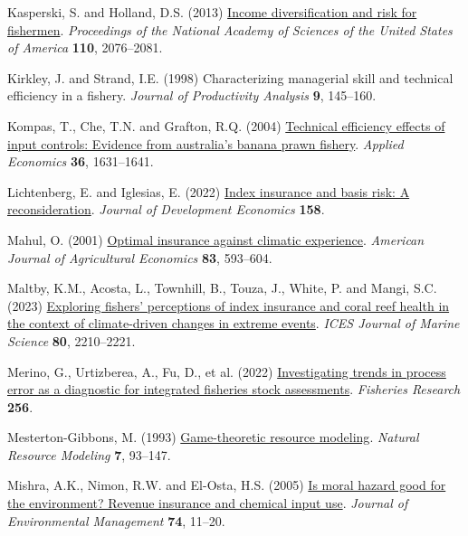 \documentclass[
  letterpaper,
  DIV=11,
  numbers=noendperiod]{scrartcl}
\newlength{\cslhangindent}
\newlength{\cslentryspacingunit} %
\newenvironment{CSLReferences}[2] %
 {%
  \setlength{\parindent}{0pt}
  \ifodd #1
  \let\oldpar\par
  \def\par{\hangindent=\cslhangindent\oldpar}
  \fi
  \setlength{\parskip}{#2\cslentryspacingunit}
 }%
 {}
\theoremstyle{plain}
\theoremstyle{plain}
\theoremstyle{remark}
\begin{document}
\begin{CSLReferences}{1}{0}
\leavevmode{}%
Kasperski, S. and Holland, D.S. (2013)
\href{https://doi.org/10.1073/pnas.1212278110}{Income diversification
and risk for fishermen}. \emph{Proceedings of the National Academy of
Sciences of the United States of America} \textbf{110}, 2076--2081.

\leavevmode{}%
Kirkley, J. and Strand, I.E. (1998) Characterizing managerial skill and
technical efficiency in a fishery. \emph{Journal of Productivity
Analysis} \textbf{9}, 145--160.

\leavevmode{}%
Kompas, T., Che, T.N. and Grafton, R.Q. (2004)
\href{https://doi.org/10.1080/0003684042000218561}{Technical efficiency
effects of input controls: Evidence from australia's banana prawn
fishery}. \emph{Applied Economics} \textbf{36}, 1631--1641.

\leavevmode{}%
Lichtenberg, E. and Iglesias, E. (2022)
\href{https://doi.org/10.1016/j.jdeveco.2022.102883}{Index insurance and
basis risk: A reconsideration}. \emph{Journal of Development Economics}
\textbf{158}.

\leavevmode{}%
Mahul, O. (2001) \href{https://doi.org/10.1111/0002-9092.00180}{Optimal
insurance against climatic experience}. \emph{American Journal of
Agricultural Economics} \textbf{83}, 593--604.

\leavevmode{}%
Maltby, K.M., Acosta, L., Townhill, B., Touza, J., White, P. and Mangi,
S.C. (2023) \href{https://doi.org/10.1093/icesjms/fsac003}{Exploring
fishers' perceptions of index insurance and coral reef health in the
context of climate-driven changes in extreme events}. \emph{ICES Journal
of Marine Science} \textbf{80}, 2210--2221.

\leavevmode{}%
Merino, G., Urtizberea, A., Fu, D., et al. (2022)
\href{https://doi.org/10.1016/j.fishres.2022.106478}{Investigating
trends in process error as a diagnostic for integrated fisheries stock
assessments}. \emph{Fisheries Research} \textbf{256}.

\leavevmode{}%
Mesterton-Gibbons, M. (1993)
\href{https://doi.org/10.1111/j.1939-7445.1993.tb00143.x}{Game-theoretic
resource modeling}. \emph{Natural Resource Modeling} \textbf{7},
93--147.

\leavevmode{}%
Mishra, A.K., Nimon, R.W. and El-Osta, H.S. (2005)
\href{https://doi.org/10.1016/j.jenvman.2004.08.003}{Is moral hazard
good for the environment? Revenue insurance and chemical input use}.
\emph{Journal of Environmental Management} \textbf{74}, 11--20.


\end{CSLReferences}
\end{document}
